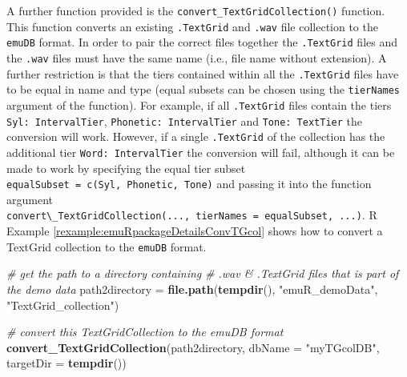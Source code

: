 \documentclass[]{book}
\newenvironment{Shaded}{\begin{snugshade}}{\end{snugshade}}
\newcommand{\CommentTok}[1]{\textcolor[rgb]{0.56,0.35,0.01}{\textit{#1}}}
\newcommand{\DataTypeTok}[1]{\textcolor[rgb]{0.13,0.29,0.53}{#1}}
\newcommand{\KeywordTok}[1]{\textcolor[rgb]{0.13,0.29,0.53}{\textbf{#1}}}
\newcommand{\NormalTok}[1]{#1}
\newcommand{\StringTok}[1]{\textcolor[rgb]{0.31,0.60,0.02}{#1}}
\theoremstyle{definition}
\theoremstyle{definition}
\theoremstyle{definition}
\theoremstyle{remark}
\begin{document}
A further function provided is the
\texttt{convert\_TextGridCollection()} function. This function converts
an existing \texttt{.TextGrid} and \texttt{.wav} file collection to the
\texttt{emuDB} format. In order to pair the correct files together the
\texttt{.TextGrid} files and the \texttt{.wav} files must have the same
name (i.e., file name without extension). A further restriction is that
the tiers contained within all the \texttt{.TextGrid} files have to be
equal in name and type (equal subsets can be chosen using the
\texttt{tierNames} argument of the function). For example, if all
\texttt{.TextGrid} files contain the tiers \texttt{Syl:\ IntervalTier},
\texttt{Phonetic:\ IntervalTier} and \texttt{Tone:\ TextTier} the
conversion will work. However, if a single \texttt{.TextGrid} of the
collection has the additional tier \texttt{Word:\ IntervalTier} the
conversion will fail, although it can be made to work by specifying the
equal tier subset
\texttt{equalSubset\ =\ c(\textquotesingle{}Syl\textquotesingle{},\ \textquotesingle{}Phonetic\textquotesingle{},\ \textquotesingle{}Tone\textquotesingle{})}
and passing it into the function argument
\texttt{convert\textbackslash{}\_TextGridCollection(...,\ tierNames\ =\ equalSubset,\ ...)}.
R Example \ref{rexample:emuRpackageDetailsConvTGcol} shows how to
convert a TextGrid collection to the \texttt{emuDB} format.

\begin{Shaded}
\begin{Highlighting}[]
\CommentTok{# get the path to a directory containing}
\CommentTok{# .wav & .TextGrid files that is part of the demo data}
\NormalTok{path2directory =}\StringTok{ }\KeywordTok{file.path}\NormalTok{(}\KeywordTok{tempdir}\NormalTok{(),}
                           \StringTok{"emuR_demoData"}\NormalTok{,}
                           \StringTok{"TextGrid_collection"}\NormalTok{)}

\CommentTok{# convert this TextGridCollection to the emuDB format}
\KeywordTok{convert_TextGridCollection}\NormalTok{(path2directory, }\DataTypeTok{dbName =} \StringTok{"myTGcolDB"}\NormalTok{,}
                           \DataTypeTok{targetDir =} \KeywordTok{tempdir}\NormalTok{())}
\end{Highlighting}
\end{Shaded}
\end{document}
